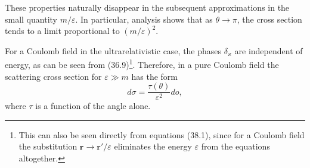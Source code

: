 These properties naturally disappear in the subsequent approximations in the small quantity $m/\varepsilon$. In particular, analysis shows that as $\theta\to\pi$, the cross section tends to a limit proportional to $(m/\varepsilon)^2$.

For a Coulomb field in the ultrarelativistic case, the phases $\delta_\varkappa$ are independent of energy, as can be seen from (36.9)\footnote{This can also be seen directly from equations (38.1), since for a Coulomb field the substitution $\mathbf r\to\mathbf r'/\varepsilon$ eliminates the energy $\varepsilon$ from the equations altogether.}. Therefore, in a pure Coulomb field the scattering cross section for $\varepsilon\gg m$ has the form
\begin{equation}
d\sigma=\frac{\tau(\theta)}{\varepsilon^2}do,
\tag{38.7}
\end{equation}
where $\tau$ is a function of the angle alone.
